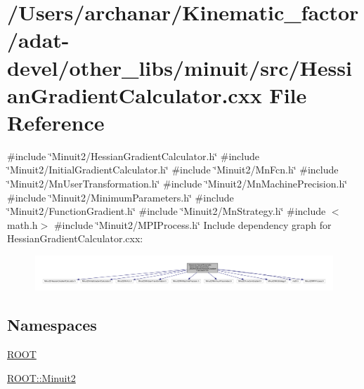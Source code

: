 \hypertarget{adat-devel_2other__libs_2minuit_2src_2HessianGradientCalculator_8cxx}{}\section{/\+Users/archanar/\+Kinematic\+\_\+factor/adat-\/devel/other\+\_\+libs/minuit/src/\+Hessian\+Gradient\+Calculator.cxx File Reference}
\label{adat-devel_2other__libs_2minuit_2src_2HessianGradientCalculator_8cxx}
{\ttfamily \#include \char`\"{}Minuit2/\+Hessian\+Gradient\+Calculator.\+h\char`\"{}}\newline
{\ttfamily \#include \char`\"{}Minuit2/\+Initial\+Gradient\+Calculator.\+h\char`\"{}}\newline
{\ttfamily \#include \char`\"{}Minuit2/\+Mn\+Fcn.\+h\char`\"{}}\newline
{\ttfamily \#include \char`\"{}Minuit2/\+Mn\+User\+Transformation.\+h\char`\"{}}\newline
{\ttfamily \#include \char`\"{}Minuit2/\+Mn\+Machine\+Precision.\+h\char`\"{}}\newline
{\ttfamily \#include \char`\"{}Minuit2/\+Minimum\+Parameters.\+h\char`\"{}}\newline
{\ttfamily \#include \char`\"{}Minuit2/\+Function\+Gradient.\+h\char`\"{}}\newline
{\ttfamily \#include \char`\"{}Minuit2/\+Mn\+Strategy.\+h\char`\"{}}\newline
{\ttfamily \#include $<$math.\+h$>$}\newline
{\ttfamily \#include \char`\"{}Minuit2/\+M\+P\+I\+Process.\+h\char`\"{}}\newline
Include dependency graph for Hessian\+Gradient\+Calculator.\+cxx\+:
\nopagebreak
\begin{figure}[H]
\begin{center}
\leavevmode
\includegraphics[width=350pt]{de/d3f/adat-devel_2other__libs_2minuit_2src_2HessianGradientCalculator_8cxx__incl}
\end{center}
\end{figure}
\subsection*{Namespaces}
\begin{DoxyCompactItemize}
\item 
 \mbox{\hyperlink{namespaceROOT}{R\+O\+OT}}
\item 
 \mbox{\hyperlink{namespaceROOT_1_1Minuit2}{R\+O\+O\+T\+::\+Minuit2}}
\end{DoxyCompactItemize}
